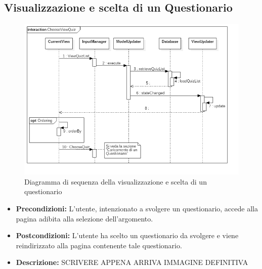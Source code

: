 \documentclass[a4paper,11pt]{article}
\begin{document}
	\subsection{Visualizzazione e scelta di un Questionario}
	\begin{figure}[h!]
	\begin{center}
		\includegraphics[scale=0.5]{../images/ChooseViewQuiz.png}
		\caption{Diagramma di sequenza della visualizzazione e scelta di un questionario}
	\end{center}
	\end{figure}
	\begin{itemize}
	\item\textbf{Precondizioni:} L'utente, intenzionato a svolgere un questionario, accede alla pagina adibita alla selezione dell'argomento.\\
	\item\textbf{Postcondizioni:} L'utente ha scelto un questionario da svolgere e viene reindirizzato alla pagina contenente tale questionario.\\ %
	\item\textbf{Descrizione:} SCRIVERE APPENA ARRIVA IMMAGINE DEFINITIVA
	\end{itemize}
	\newpage
	
\end{document}
